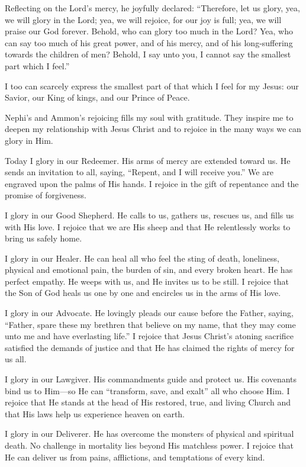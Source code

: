 \documentclass[letterpaper, 11pt]{report}
\begin{document}
Reflecting on the Lord’s mercy, he joyfully declared: “Therefore, let us glory, yea, we will glory in the Lord; yea, we will rejoice, for our joy is full; yea, we will praise our God forever. Behold, who can glory too much in the Lord? Yea, who can say too much of his great power, and of his mercy, and of his long-suffering towards the children of men? Behold, I say unto you, I cannot say the smallest part which I feel.”

I too can scarcely express the smallest part of that which I feel for my Jesus: our Savior, our King of kings, and our Prince of Peace.

Nephi’s and Ammon’s rejoicing fills my soul with gratitude. They inspire me to deepen my relationship with Jesus Christ and to rejoice in the many ways we can glory in Him.

Today I glory in our Redeemer. His arms of mercy are extended toward us. He sends an invitation to all, saying, “Repent, and I will receive you.” We are engraved upon the palms of His hands. I rejoice in the gift of repentance and the promise of forgiveness.

I glory in our Good Shepherd. He calls to us, gathers us, rescues us, and fills us with His love. I rejoice that we are His sheep and that He relentlessly works to bring us safely home.

I glory in our Healer. He can heal all who feel the sting of death, loneliness, physical and emotional pain, the burden of sin, and every broken heart. He has perfect empathy. He weeps with us, and He invites us to be still. I rejoice that the Son of God heals us one by one and encircles us in the arms of His love.

I glory in our Advocate. He lovingly pleads our cause before the Father, saying, “Father, spare these my brethren that believe on my name, that they may come unto me and have everlasting life.” I rejoice that Jesus Christ’s atoning sacrifice satisfied the demands of justice and that He has claimed the rights of mercy for us all.

I glory in our Lawgiver. His commandments guide and protect us. His covenants bind us to Him—so He can “transform, save, and exalt” all who choose Him. I rejoice that He stands at the head of His restored, true, and living Church and that His laws help us experience heaven on earth.

I glory in our Deliverer. He has overcome the monsters of physical and spiritual death. No challenge in mortality lies beyond His matchless power. I rejoice that He can deliver us from pains, afflictions, and temptations of every kind.
\end{document}

